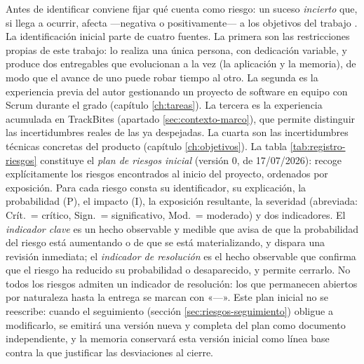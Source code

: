 Antes de identificar conviene fijar qué cuenta como riesgo: un suceso \emph{incierto} que, si llega a ocurrir, afecta —negativa o positivamente— a los objetivos del trabajo \parencite{boehm-risk}.
La identificación inicial parte de cuatro fuentes.
La primera son las restricciones propias de este trabajo: lo realiza una única persona, con dedicación variable, y produce dos entregables que evolucionan a la vez (la aplicación \bukit y la memoria), de modo que el avance de uno puede robar tiempo al otro.
La segunda es la experiencia previa del autor gestionando un proyecto de software en equipo con Scrum durante el grado (capítulo \ref{ch:tareas}).
La tercera es la experiencia acumulada en TrackBites (apartado \ref{sec:contexto-marco}), que permite distinguir las incertidumbres reales de las ya despejadas.
La cuarta son las incertidumbres técnicas concretas del producto (capítulo \ref{ch:objetivos}).
La tabla \ref{tab:registro-riesgos} constituye el \emph{plan de riesgos inicial} (versión 0, de 17/07/2026): recoge explícitamente los riesgos encontrados al inicio del proyecto, ordenados por exposición.
Para cada riesgo consta su identificador, su explicación, la probabilidad (P), el impacto (I), la exposición resultante, la severidad (abreviada: Crít.\ = crítico, Sign.\ = significativo, Mod.\ = moderado) y dos indicadores.
El \emph{indicador clave} es un hecho observable y medible que avisa de que la probabilidad del riesgo está aumentando o de que se está materializando, y dispara una revisión inmediata; el \emph{indicador de resolución} es el hecho observable que confirma que el riesgo ha reducido su probabilidad o desaparecido, y permite cerrarlo.
No todos los riesgos admiten un indicador de resolución: los que permanecen abiertos por naturaleza hasta la entrega se marcan con «—».
Este plan inicial no se reescribe: cuando el seguimiento (sección \ref{sec:riesgos-seguimiento}) obligue a modificarlo, se emitirá una versión nueva y completa del plan como documento independiente, y la memoria conservará esta versión inicial como línea base contra la que justificar las desviaciones al cierre.

